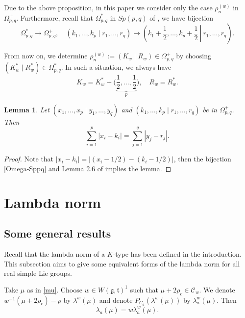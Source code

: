 \documentclass[11pt]{amsart}
\theoremstyle{plain}
\newtheorem{lemma}[thm]{Lemma}
\theoremstyle{definition}
\newcommand{\mfg}{\mathfrak{g}}
\newcommand{\mft}{\mathfrak{t}}
\newcommand{\C}{\mathcal{C}}
\begin{document}
Due to the above proposition, in this paper we consider only the case $\rho_n^{(w)}$ in $\Omega_{p,q}^+$. Furthermore, recall that $\Omega_{p,q}^*$ in $Sp(p,q)$ of \cite{DY2}, we have bijection
\begin{equation}\label{Omega-Sppq}
	\Omega_{p,q}^*\to \Omega_{p,q}^+,\quad (k_1,\dots,k_p\mid r_1,\dots,r_q)\mapsto \left.\left(k_1+\frac{1}{2},\dots,k_p+\frac{1}{2}\ \right| \ r_1,\dots,r_q\right).
\end{equation}

From now on, we determine $\rho_n^{(w)}:=(K_w\mid R_w)\in \Omega_{p,q}^+$ by choosing $(K_w^*\mid R_w^*)\in\Omega^*_{p,q}$. In such a situation, we always have
\[K_w=K_w^*+\bigg(\underbrace{\frac{1}{2},\dots,\frac{1}{2}}_p\bigg),\quad R_w=R_w^*.\]
	\begin{lemma}\label{Omega-pq}
	Let $(x_1,\dots,x_p\mid y_1,\dots,y_q)$ and $(k_1,\dots,k_p\mid r_1,\dots,r_q)$ be in $\Omega_{p,q}^+$. Then
	\[\sum_{i=1}^p |x_i-k_i|=\sum_{j=1}^q |y_j-r_j|.\]
\end{lemma}	
\begin{proof}
	Note that $|x_i-k_i|=|(x_i-1/2)-(k_i-1/2)|$, then the bijection \eqref{Omega-Sppq} and Lemma 2.6 of \cite{DY2} implies the lemma.
\end{proof}

\section{Lambda norm}\label{sec-lambda-norm}

\subsection{Some general results}

Recall that the lambda norm of a $K$-type has been defined in the introduction.
 This subsection aims to give some equivalent forms of the lambda norm for all real simple Lie groups.

Take $\mu$ as in \eqref{mu}. Choose $w\in W(\mfg,\mft)^1$ such that $\mu+2\rho_c\in \C_w$. We denote $w^{-1}(\mu+2\rho_c)-\rho$ by $\lambda^w(\mu)$ and denote $P_{C_\mfg}(\lambda^w(\mu))$ by $\lambda_a^w(\mu)$. Then
\begin{equation}\label{lambda-a}
	\lambda_a(\mu)=w\lambda_a^w(\mu).
\end{equation}
\end{document}
